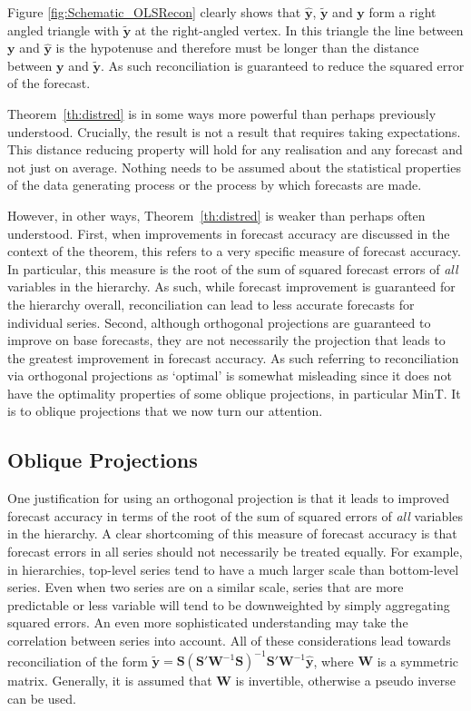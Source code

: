 \documentclass[12pt]{article}
\theoremstyle{definition}
\theoremstyle{property}
\begin{document}
	
	Figure \ref{fig:Schematic_OLSRecon} clearly shows that $\hat{\bm{y}}$, $\tilde{\bm{y}}$ and $\bm{y}$ form a right angled triangle with $\tilde{\bm{y}}$ at the right-angled vertex.  In this triangle the line between $\bm{y}$ and $\hat{\bm{y}}$ is the hypotenuse and therefore must be longer than the distance between $\bm{y}$ and $\tilde{\bm{y}}$.  As such reconciliation is guaranteed to reduce the squared error of the forecast.
	
    Theorem~\ref{th:distred} is in some ways more powerful than perhaps previously understood.  Crucially, the result is not a result that requires taking expectations.  This distance reducing property will hold for any realisation and any forecast and not just on average.  Nothing needs to be assumed about the statistical properties of the data generating process or the process by which forecasts are made.

    However, in other ways, Theorem~\ref{th:distred} is weaker than perhaps often understood. First, when improvements in forecast accuracy are discussed in the context of the theorem, this refers to a very specific measure of forecast accuracy.  In particular, this measure is the root of the sum of squared forecast errors of {\em all} variables in the hierarchy.  As such, while forecast improvement is guaranteed for the hierarchy overall, reconciliation can lead to less accurate forecasts for individual series. Second, although orthogonal projections are guaranteed to improve on base forecasts, they are not necessarily the projection that leads to the greatest improvement in forecast accuracy.  As such referring to reconciliation via orthogonal projections as `optimal' is somewhat misleading since it does not have the optimality properties of some oblique projections, in particular MinT. It is to oblique projections that we now turn our attention.
    	
	\subsection{Oblique Projections}\label{sec:oblique}
	
	One justification for using an orthogonal projection is that it leads to improved forecast accuracy in terms of the root of the sum of squared errors of {\em all} variables in the hierarchy.  A clear shortcoming of this measure of forecast accuracy is that forecast errors in all series should not necessarily be treated equally.  For example, in hierarchies, top-level series tend to have a much larger scale than bottom-level series.  Even when two series are on a similar scale, series that are more predictable or less variable will tend to be downweighted by simply aggregating squared errors.  An even more sophisticated understanding may take the correlation between series into account.  All of these considerations lead towards reconciliation of the form $\tilde{\bm{y}}=\bm{S}\left(\bm{S}'\bm{W}^{-1}\bm{S}\right)^{-1}\bm{S}'\bm{W}^{-1}\hat{\bm{y}}$, where $\bm{W}$ is a symmetric matrix.  Generally, it is assumed that $\bm{W}$ is invertible, otherwise a pseudo inverse can be used.
	
\end{document}
